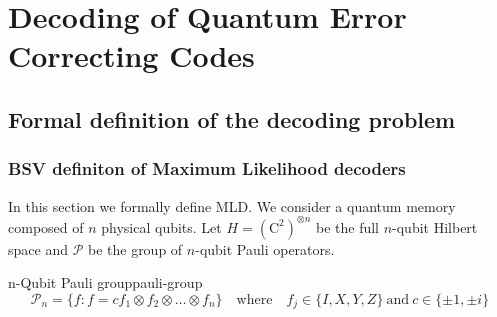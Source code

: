 \chapter{Decoding of Quantum Error Correcting Codes}

\section{Formal definition of the decoding problem}

\subsection{BSV definiton of Maximum Likelihood decoders}
In this section we formally define MLD. We consider a quantum memory composed of \(n\) physical qubits. Let \(H= (\mathrm{C}^{2})^{\otimes n}\) be the full \(n\)-qubit Hilbert space and \(\mathcal{P}\) be the group of \(n\)-qubit Pauli operators.
\begin{boxed-defn}{n-Qubit Pauli group}{pauli-group}
\begin{equation*}
    \mathcal{P}_n = \{f: f = cf_1 \otimes f_2 \otimes \dots \otimes f_n\} \quad \text{where} \quad f_j \in \{I, X, Y, Z\} \ \text{and} \ c \in \{\pm 1, \pm i\}
\end{equation*}
\end{boxed-defn}

